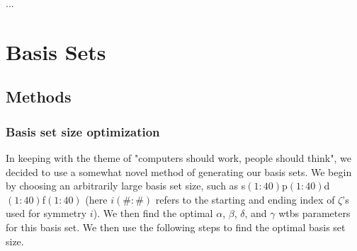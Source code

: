 \documentclass[12pt]{report}
\begin{document}
\begin{acknowledgements}
...
\end{acknowledgements}
%
%
%
%
%
%
%
%
%
%
%
%
%
%
%
%
%
%
%
%
%
%
%
%
%
%
%
%
%
%
%
%
%
%
%
%
%
%
%
%

\doublespacing		%

\begin{abstract}
......
\end{abstract}%
%
%
%
%
%
%
%
%
%
%
%
%
%
%
%
%
%
%
%
%
%
%
%
%
%
%
%
%
%
%
%
%
%
%
%
%
%
%
%
%
%
%
%
%
%
%

\doublespacing	%

\tableofcontents
\listoffigures
\listoftables
%
%
%
%
%
%
%
%
%
%
%
%
%
%
%
%
%
%
%
%
%
%
%
%
%
%
%
%
%
%
%
%
%
%
%
%
%
%
%
%
%

\bodyoftext

\chapter{Basis Sets}
\section{Methods}
\subsection{Basis set size optimization}
In keeping with the theme of "computers should work, people should think", we decided to use a somewhat novel method of generating our basis sets. We begin by choosing an arbitrarily large basis set size, such as s$(1:40)$p$(1:40)$d$(1:40)$f$(1:40)$ (here $i(\#:\#)$ refers to the starting and ending index of $\zeta$'s used for symmetry $i$). We then find the optimal $\alpha$, $\beta$, $\delta$, and $\gamma$ wtbs parameters for this basis set. We then use the following steps to find the optimal basis set size.
\end{document}
